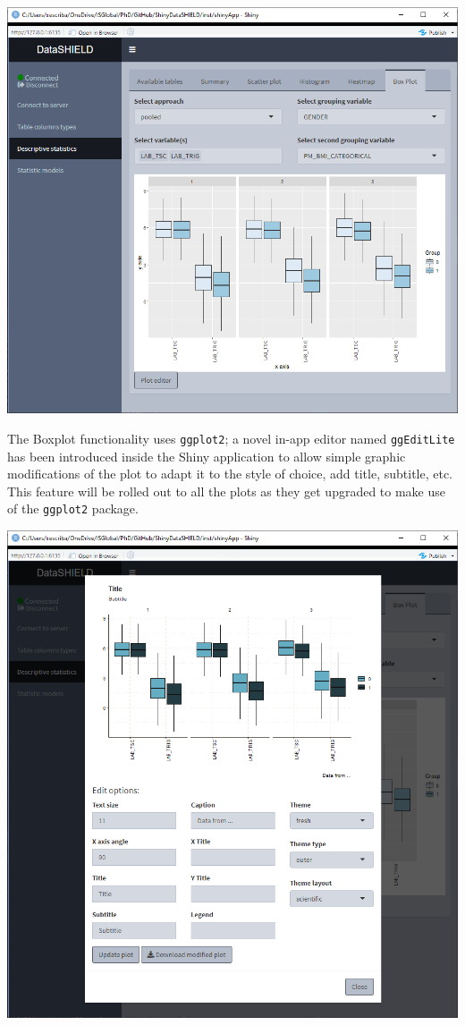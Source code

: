 \documentclass[
]{book}
\begin{document}
\includegraphics{images/descriptive_stats6_4.png}

The Boxplot functionality uses \texttt{ggplot2}; a novel in-app editor named \texttt{ggEditLite} has been introduced inside the Shiny application to allow simple graphic modifications of the plot to adapt it to the style of choice, add title, subtitle, etc. This feature will be rolled out to all the plots as they get upgraded to make use of the \texttt{ggplot2} package.

\includegraphics{images/descriptive_stats6_5.png}
\end{document}
